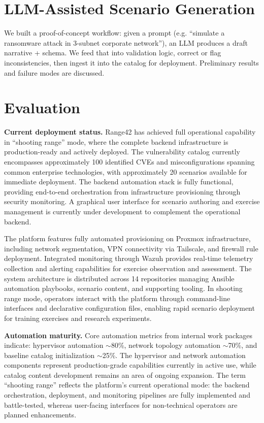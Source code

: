 \documentclass[11pt]{article}
\begin{document}
\section{LLM-Assisted Scenario Generation}
We built a proof-of-concept workflow: given a prompt (e.g. “simulate a ransomware attack in 3-subnet corporate network”), an LLM produces a draft narrative + schema. We feed that into validation logic, correct or flag inconsistencies, then ingest it into the catalog for deployment. Preliminary results and failure modes are discussed.

\section{Evaluation}


\textbf{Current deployment status.} 
Range42 has achieved full operational capability in ``shooting range'' mode, where the complete backend infrastructure is production-ready and actively deployed.
The vulnerability catalog currently encompasses approximately 100 identified CVEs and misconfigurations spanning common enterprise technologies, with approximately 20 scenarios available for immediate deployment.
The backend automation stack is fully functional, providing end-to-end orchestration from infrastructure provisioning through security monitoring.
A graphical user interface for scenario authoring and exercise management is currently under development to complement the operational backend.

The platform features fully automated provisioning on Proxmox infrastructure, including network segmentation, VPN connectivity via Tailscale, and firewall rule deployment.
Integrated monitoring through Wazuh provides real-time telemetry collection and alerting capabilities for exercise observation and assessment.
The system architecture is distributed across 14 repositories managing Ansible automation playbooks, scenario content, and supporting tooling.
In shooting range mode, operators interact with the platform through command-line interfaces and declarative configuration files, enabling rapid scenario deployment for training exercises and research experiments.

\textbf{Automation maturity.} 
Core automation metrics from internal work packages indicate: 
hypervisor automation $\sim$80\%, 
network topology automation $\sim$70\%, 
and baseline catalog initialization $\sim$25\%.
The hypervisor and network automation components represent production-grade capabilities currently in active use,
while catalog content development remains an area of ongoing expansion.
The term ``shooting range'' reflects the platform's current operational mode: 
the backend orchestration, deployment, and monitoring pipelines are fully implemented and battle-tested,
whereas user-facing interfaces for non-technical operators are planned enhancements.
\end{document}
